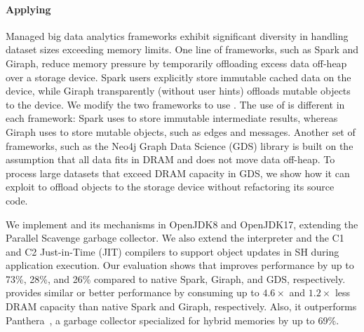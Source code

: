 \paragraph{\textbf{Applying \teraheapName{}}}
%
Managed big data analytics frameworks exhibit significant diversity in handling dataset sizes exceeding memory limits.
%
One line of frameworks, such as Spark and Giraph, reduce memory pressure by temporarily offloading excess data off-heap over a storage device.
Spark users explicitly store immutable cached data on the device, while Giraph transparently (without user hints) offloads mutable objects to the device.
We modify the two frameworks to use \teraheapName{}.
The use of \teraheapName{} is different in each framework: Spark uses \teraheapName{} to store immutable intermediate results, whereas Giraph uses \teraheapName{} to store mutable objects, such as edges and messages.
%
Another set of frameworks, such as the Neo4j Graph Data Science (GDS) library is built on the assumption that all data fits in DRAM and does not move data off-heap.
To process large datasets that exceed DRAM capacity in GDS, we show how it can exploit \teraheapName{} to offload objects to the storage device without refactoring its source code.

We implement \teraheapName{} and its mechanisms in OpenJDK8 and OpenJDK17, extending the Parallel Scavenge garbage collector.
We also extend the interpreter and the C1 and C2 Just-in-Time (JIT) compilers to support object updates in SH during application execution.
%
Our evaluation shows that \teraheapName{} improves performance by up to 73\%, 28\%, and 26\% compared to native Spark, Giraph, and GDS, respectively.
%
\teraheapName{} provides similar or better performance by consuming up to $4.6\times$ and $1.2\times$ less DRAM capacity than native Spark and Giraph, respectively.
Also, it outperforms Panthera~\cite{wang:Panthera}, a garbage collector specialized for hybrid memories by up to 69\%.

